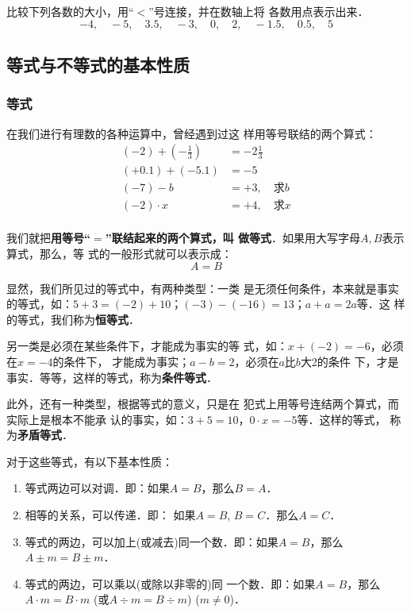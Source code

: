 \begin{ex}
    比较下列各数的大小，用“$<$”号连接，并在数轴上将
    各数用点表示出来．
    \[-4,\quad -5,\quad 3.5,\quad -3,\quad 0,\quad 2,\quad -1.5,\quad 0.5,\quad 5  \]
\end{ex}

\subsection{等式与不等式的基本性质}
\subsubsection{等式}
在我们进行有理数的各种运算中，曾经遇到过这
样用等号联结的两个算式：
\[\begin{split}
(-2)+\left(-\frac{1}{3}\right) &=-2\frac{1}{3}\\
(+0.1)+(-5.1)&=-5\\
(-7)-b&=+3,\quad \text{求$b$}    \\
(-2)\cdot x&=+4,\quad \text{求$x$}    \\
\end{split}\]

我们就把\textbf{用等号“$=$”联结起来的两个算式，叫
做等式}．如果用大写字母$A, B$表示算式，那么，等
式的一般形式就可以表示成：
                      \[A=B\]
                      
显然，我们所见过的等式中，有两种类型：一类
是无须任何条件，本来就是事实的等式，如：$5+3=
  (-2)+10$；$(-3)-(-16)= 13$；$a+a=2a$等．这
样的等式，我们称为\textbf{恒等式}．

另一类是必须在某些条件下，才能成为事实的等
式，如：$x+(-2)=-6$，必须在$x=-4$的条件下，
才能成为事实；$a-b=2$，必须在$a$比$b$大2的条件
下，才是事实．等等，这样的等式，称为\textbf{条件等式}．

    此外，还有一种类型，根据等式的意义，只是在
犯式上用等号连结两个算式，而实际上是根本不能承
认的事实，如：$3+5=10$，$0\cdot x=-5$等．这样的等式，
称为\textbf{矛盾等式}．

对于这些等式，有以下基本性质：

\begin{blk}{}
\begin{enumerate}
    \item 等式两边可以对调．即：如果$A= B$，那么$B=A$．
    \item 相等的关系，可以传递．即：
    如果$A=B$,  $B=C$．那么$A=C$．
    \item 等式的两边，可以加上(或减去)同一个数．即：如果$A= B$，那么$A\pm m=B\pm m$．
    \item 等式的两边，可以乘以(或除以非零的)同
一个数．即：如果$A=B$，那么$A\cdot m=B\cdot m$ (或$A\div m =
B\div m$) ($m\ne 0$)．
\end{enumerate}
\end{blk}


